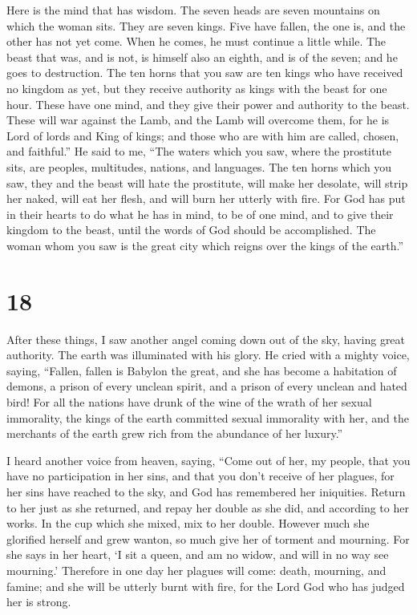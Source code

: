  Here is the mind that has wisdom. The seven heads are
seven mountains on which the woman sits.  They are seven
kings. Five have fallen, the one is, and the other has not yet come.
When he comes, he must continue a little while.  The
beast that was, and is not, is himself also an eighth, and is of the
seven; and he goes to destruction.  The ten horns that
you saw are ten kings who have received no kingdom as yet, but they
receive authority as kings with the beast for one hour. 
These have one mind, and they give their power and authority to the
beast.  These will war against the Lamb, and the Lamb
will overcome them, for he is Lord of lords and King of kings; and those
who are with him are called, chosen, and faithful.''  He
said to me, ``The waters which you saw, where the prostitute sits, are
peoples, multitudes, nations, and languages.  The ten
horns which you saw, they and the beast will hate the prostitute, will
make her desolate, will strip her naked, will eat her flesh, and will
burn her utterly with fire.  For God has put in their
hearts to do what he has in mind, to be of one mind, and to give their
kingdom to the beast, until the words of God should be accomplished.
 The woman whom you saw is the great city which reigns
over the kings of the earth.''

\hypertarget{section-17}{%
\section{18}\label{section-17}}

 After these things, I saw another angel coming down out
of the sky, having great authority. The earth was illuminated with his
glory.  He cried with a mighty voice, saying, ``Fallen,
fallen is Babylon the great, and she has become a habitation of demons,
a prison of every unclean spirit, and a prison of every unclean and
hated bird!  For all the nations have drunk of the wine of
the wrath of her sexual immorality, the kings of the earth committed
sexual immorality with her, and the merchants of the earth grew rich
from the abundance of her luxury.''

 I heard another voice from heaven, saying, ``Come out of
her, my people, that you have no participation in her sins, and that you
don't receive of her plagues,  for her sins have reached
to the sky, and God has remembered her iniquities.  Return
to her just as she returned, and repay her double as she did, and
according to her works. In the cup which she mixed, mix to her double.
 However much she glorified herself and grew wanton, so
much give her of torment and mourning. For she says in her heart, `I sit
a queen, and am no widow, and will in no way see mourning.'
 Therefore in one day her plagues will come: death,
mourning, and famine; and she will be utterly burnt with fire, for the
Lord God who has judged her is strong.

